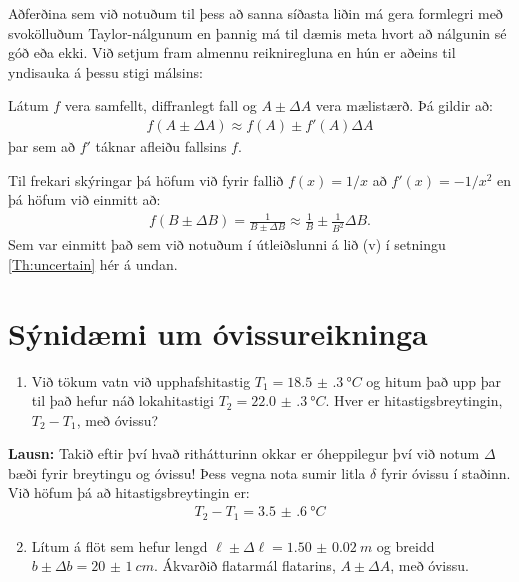 \ifdefined \wholebook \else\documentclass[oneside]{book}\usepackage{EdlBook}\graphicspath{{figures/}}
\begin{document}
Aðferðina sem við notuðum til þess að sanna síðasta liðin má gera formlegri með svokölluðum Taylor-nálgunum en þannig má til dæmis meta hvort að nálgunin sé góð eða ekki. Við setjum fram almennu reikniregluna en hún er aðeins til yndisauka á þessu stigi málsins:
\begin{tcolorbox}
\begin{setning}
Látum $f$ vera samfellt, diffranlegt fall og $A \pm \Delta A$ vera mælistærð. Þá gildir að:
\begin{align*}
    f(A \pm \Delta A) \approx f(A) \pm f'(A) \Delta A
\end{align*}
þar sem að $f'$ táknar afleiðu fallsins $f$.
\end{setning}
\end{tcolorbox}

Til frekari skýringar þá höfum við fyrir fallið $f(x) = 1/x$ að $f'(x) = - 1/x^2$ en þá höfum við einmitt að:
\begin{align*}
    f(B \pm \Delta B) = \frac{1}{B \pm \Delta B} \approx \frac{1}{B} \pm \frac{1}{B^2} \Delta B.
\end{align*}
Sem var einmitt það sem við notuðum í útleiðslunni á lið (v) í setningu \ref{Th:uncertain} hér á undan.

\newpage

\section{Sýnidæmi um óvissureikninga}


\begin{enumerate}[label = \textbf{Sýnidæmi \thechapter.\arabic*.}]

\item Við tökum vatn við upphafshitastig $T_1 = \SI{18.5(3)}{\degree C}$ og hitum það upp þar til það hefur náð lokahitastigi $T_2 = \SI{22.0(3)}{\degree C}$. Hver er hitastigsbreytingin, $T_2 - T_1$, með óvissu? 
\end{enumerate}

\textbf{Lausn:} Takið eftir því hvað rithátturinn okkar er óheppilegur því við notum $\Delta$ bæði fyrir breytingu og óvissu! Þess vegna nota sumir litla $\delta$ fyrir óvissu í staðinn. Við höfum þá að hitastigsbreytingin er:
\begin{align*}
    T_2 - T_1 = \SI{3.5(6)}{\degree C} 
\end{align*}

\begin{enumerate}[label = \textbf{Sýnidæmi \thechapter.\arabic*.}]

\setcounter{enumi}{1}

\item Lítum á flöt sem hefur lengd $\ell \pm \Delta \ell = \SI{1.50(2)}{m}$ og breidd $b \pm \Delta b = \SI{20(1)}{cm}$. Ákvarðið flatarmál flatarins, $A \pm \Delta A$, með óvissu.

\end{enumerate}
\end{document}
